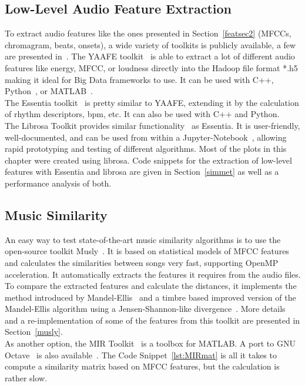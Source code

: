 \subsection{Low-Level Audio Feature Extraction}
To extract audio features like the ones presented in Section~\ref{featsec2} (MFCCs, chromagram, beats, onsets), a wide variety of toolkits is publicly available, a few are presented in~\cite{audiofeattoolb}.
The YAAFE toolkit~\cite{yaafe1} is able to extract a lot of different audio features like energy, MFCC, or loudness directly into the Hadoop file format *.h5 making it ideal for Big Data frameworks to use. It can be used with C++, Python~\cite{pylang}, or MATLAB~\cite{matl1}.\\
The Essentia toolkit~\cite{essentia1} is pretty similar to YAAFE, extending it by the calculation of rhythm descriptors, bpm, etc. It can also be used with C++ and Python.\\
The Librosa Toolkit provides similar functionality~\cite{labrosa1} as Essentia. It is user-friendly, well-documented, and can be used from within a Jupyter-Notebook~\cite{jupyter}, allowing rapid prototyping and testing of different algorithms. Most of the plots in this chapter were created using librosa. Code snippets for the extraction of low-level features with Essentia and librosa are given in Section~\ref{simmet} as well as a performance analysis of both.\\

\subsection{Music Similarity}

An easy way to test state-of-the-art music similarity algorithms is to use the open-source toolkit Musly~\cite{musly1}. It is based on statistical models of MFCC features and calculates the similarities between songs very fast, supporting OpenMP acceleration. It automatically extracts the features it requires from the audio files. To compare the extracted features and calculate the distances, it implements the method introduced by Mandel-Ellis~\cite{mandelellis1} and a timbre based improved version of the Mandel-Ellis algorithm using a Jensen-Shannon-like divergence~\cite{musly2}. More details and a re-implementation of some of the features from this toolkit are presented in Section~\ref{musly}.\\
As another option, the MIR Toolkit~\cite{mirtoolbox1} is a toolbox for MATLAB. A port to GNU Octave~\cite{octave1} is also available~\cite{mirtoolbox2}. The Code Snippet~\ref{lst:MIRmat} is all it takes to compute a similarity matrix based on MFCC features, but the calculation is rather slow.


